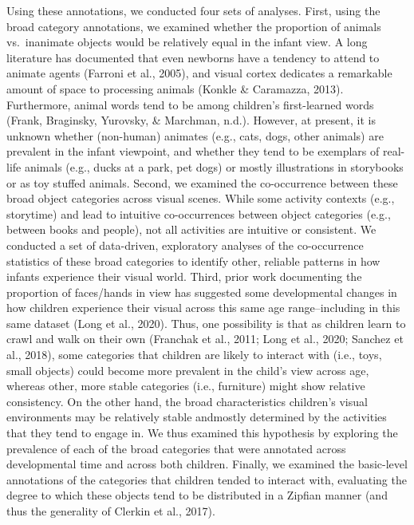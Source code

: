 \documentclass[10pt, letterpaper]{article}
\begin{document}
Using these annotations, we conducted four sets of analyses. First,
using the broad category annotations, we examined whether the proportion
of animals vs.~inanimate objects would be relatively equal in the infant
view. A long literature has documented that even newborns have a
tendency to attend to animate agents (Farroni et al., 2005), and visual
cortex dedicates a remarkable amount of space to processing animals
(Konkle \& Caramazza, 2013). Furthermore, animal words tend to be among
children's first-learned words (Frank, Braginsky, Yurovsky, \& Marchman,
n.d.). However, at present, it is unknown whether (non-human) animates
(e.g., cats, dogs, other animals) are prevalent in the infant viewpoint,
and whether they tend to be exemplars of real-life animals (e.g., ducks
at a park, pet dogs) or mostly illustrations in storybooks or as toy
stuffed animals. Second, we examined the co-occurrence between these
broad object categories across visual scenes. While some activity
contexts (e.g., storytime) and lead to intuitive co-occurrences between
object categories (e.g., between books and people), not all activities
are intuitive or consistent. We conducted a set of data-driven,
exploratory analyses of the co-occurrence statistics of these broad
categories to identify other, reliable patterns in how infants
experience their visual world. Third, prior work documenting the
proportion of faces/hands in view has suggested some developmental
changes in how children experience their visual across this same age
range--including in this same dataset (Long et al., 2020). Thus, one
possibility is that as children learn to crawl and walk on their own
(Franchak et al., 2011; Long et al., 2020; Sanchez et al., 2018), some
categories that children are likely to interact with (i.e., toys, small
objects) could become more prevalent in the child's view across age,
whereas other, more stable categories (i.e., furniture) might show
relative consistency. On the other hand, the broad characteristics
children's visual environments may be relatively stable andmostly
determined by the activities that they tend to engage in. We thus
examined this hypothesis by exploring the prevalence of each of the
broad categories that were annotated across developmental time and
across both children. Finally, we examined the basic-level annotations
of the categories that children tended to interact with, evaluating the
degree to which these objects tend to be distributed in a Zipfian manner
(and thus the generality of Clerkin et al., 2017).
\end{document}
